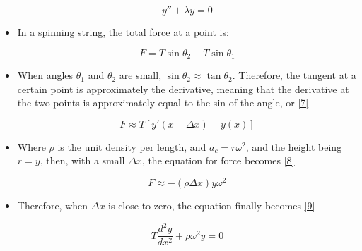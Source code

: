 \documentclass[12pt]{article}
\begin{document}
\begin{itemize}
      \begin{equation}
        y''+\lambda y=0
        \label{5}
      \end{equation}

    \item In a spinning string, the total force at a point is:

      \begin{equation}
        F=T\sin\theta_2-T\sin\theta_1
        \label{6}
      \end{equation}

    \item When angles $\theta_1$ and $\theta_2$ are small, $\sin\theta_2\approx\tan\theta_2$. Therefore, the tangent at a certain point is approximately the derivative, meaning that the derivative at the two points is approximately equal to the sin of the angle, or \eqref{7}

      \begin{equation}
        F\approx T[y'(x+\Delta x)-y(x)]
        \label{7}
      \end{equation}

    \item Where $\rho$ is the unit density per length, and $a_c=r\omega^2$, and the height being $r=y$, then, with a small $\Delta x$, the equation for force becomes \eqref{8}

      \begin{equation}
        F\approx-(\rho\Delta x)y\omega^2
        \label{8}
      \end{equation}

    \item Therefore, when $\Delta x$ is close to zero, the equation finally becomes \eqref{9}

      \begin{equation}
        T\frac{d^2y}{dx^2}+\rho\omega^2y=0
        \label{9}
      \end{equation}

\end{itemize}
\end{document}
